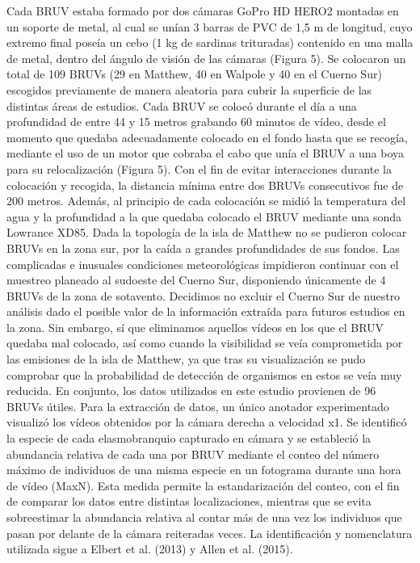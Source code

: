 \documentclass[a4paper, 11pt]{article}
\begin{document}
Cada BRUV estaba formado por dos cámaras GoPro HD HERO2 montadas en un soporte de metal, al cual se unían 3 barras de PVC de 1,5 m de longitud, cuyo extremo final poseía un cebo (1 kg de sardinas trituradas) contenido en una malla de metal, dentro del ángulo de visión de las cámaras (Figura 5). Se colocaron un total de 109 BRUVs (29 en Matthew, 40 en Walpole y 40 en el Cuerno Sur) escogidos previamente de manera aleatoria para cubrir la superficie de las distintas áreas de estudios. Cada BRUV se colocó durante el día a una profundidad de entre 44 y 15 metros grabando 60 minutos de vídeo, desde el momento que quedaba adecuadamente colocado en el fondo hasta que se recogía, mediante el uso de un motor que cobraba el cabo que unía el BRUV a una boya para su relocalización (Figura 5). Con el fin de evitar interacciones durante la colocación y recogida, la distancia mínima entre dos BRUVs consecutivos fue de 200 metros. Además, al principio de cada colocación se midió la temperatura del agua y la profundidad a la que quedaba colocado el BRUV mediante una sonda Lowrance XD85. 
Dada la topología de la isla de Matthew no se pudieron colocar BRUVs en la zona sur, por la caída a grandes profundidades de sus fondos. Las complicadas e inusuales condiciones meteorológicas impidieron continuar con el muestreo planeado al sudoeste del Cuerno Sur, disponiendo únicamente de 4 BRUVs de la zona de sotavento. Decidimos no excluir el Cuerno Sur de nuestro análisis dado el posible valor de la información extraída para futuros estudios en la zona. Sin embargo, sí que eliminamos aquellos vídeos en los que el BRUV quedaba mal colocado, así como cuando la visibilidad se veía comprometida por las emisiones de la isla de Matthew, ya que tras su visualización se pudo comprobar que la probabilidad de detección de organismos en estos se veía muy reducida. En conjunto, los datos utilizados en este estudio provienen de 96 BRUVs útiles.
Para la extracción de datos, un único anotador experimentado visualizó los vídeos obtenidos por la cámara derecha a velocidad x1. Se identificó la especie de cada elasmobranquio capturado en cámara y se estableció la abundancia relativa de cada una por BRUV mediante el conteo del número máximo de individuos de una misma especie en un fotograma durante una hora de vídeo (MaxN). Esta medida permite la estandarización del conteo, con el fin de comparar los datos entre distintas localizaciones, mientras que se evita sobreestimar la abundancia relativa al contar más de una vez los individuos que pasan por delante de la cámara reiteradas veces. La identificación y nomenclatura utilizada sigue a Elbert et al. (2013) y Allen et al. (2015).\\
\end{document}
